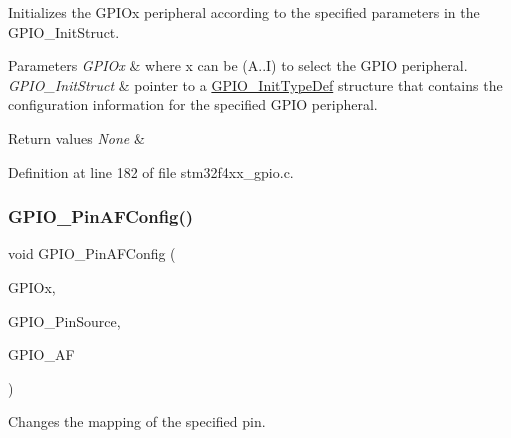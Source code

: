 Initializes the G\+P\+I\+Ox peripheral according to the specified parameters in the G\+P\+I\+O\+\_\+\+Init\+Struct. 


\begin{DoxyParams}{Parameters}
{\em G\+P\+I\+Ox} & where x can be (A..I) to select the G\+P\+IO peripheral. \\
\hline
{\em G\+P\+I\+O\+\_\+\+Init\+Struct} & pointer to a \hyperlink{struct_g_p_i_o___init_type_def}{G\+P\+I\+O\+\_\+\+Init\+Type\+Def} structure that contains the configuration information for the specified G\+P\+IO peripheral. \\
\hline
\end{DoxyParams}

\begin{DoxyRetVals}{Return values}
{\em None} & \\
\hline
\end{DoxyRetVals}


Definition at line 182 of file stm32f4xx\+\_\+gpio.\+c.

\mbox{\label{group___g_p_i_o_ga0a77617a322562ae84f8d72486032c5d}} 
\subsubsection{\texorpdfstring{G\+P\+I\+O\+\_\+\+Pin\+A\+F\+Config()}{GPIO\_PinAFConfig()}}
{\footnotesize\ttfamily void G\+P\+I\+O\+\_\+\+Pin\+A\+F\+Config (\begin{DoxyParamCaption}\item[{\hyperlink{struct_g_p_i_o___type_def}{G\+P\+I\+O\+\_\+\+Type\+Def} $\ast$}]{G\+P\+I\+Ox,  }\item[{uint16\+\_\+t}]{G\+P\+I\+O\+\_\+\+Pin\+Source,  }\item[{uint8\+\_\+t}]{G\+P\+I\+O\+\_\+\+AF }\end{DoxyParamCaption})}



Changes the mapping of the specified pin. 


